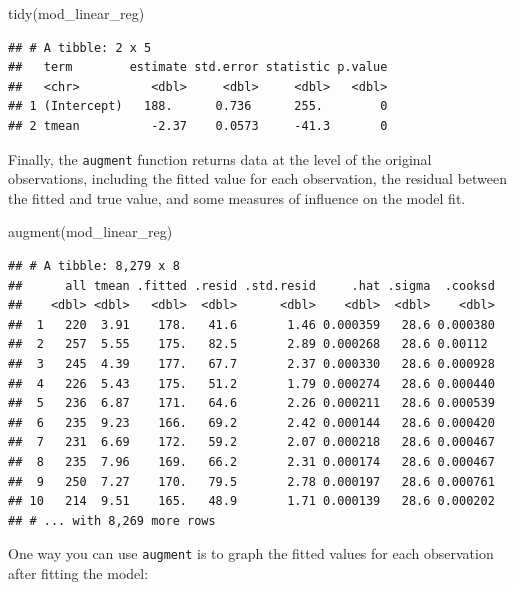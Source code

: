 \documentclass[
]{book}
\newenvironment{Shaded}{\begin{snugshade}}{\end{snugshade}}
\newcommand{\FunctionTok}[1]{\textcolor[rgb]{0.00,0.00,0.00}{#1}}
\newcommand{\NormalTok}[1]{#1}
\begin{document}
\begin{Shaded}
\begin{Highlighting}[]
\FunctionTok{tidy}\NormalTok{(mod\_linear\_reg)}
\end{Highlighting}
\end{Shaded}

\begin{verbatim}
## # A tibble: 2 x 5
##   term        estimate std.error statistic p.value
##   <chr>          <dbl>     <dbl>     <dbl>   <dbl>
## 1 (Intercept)   188.      0.736      255.        0
## 2 tmean          -2.37    0.0573     -41.3       0
\end{verbatim}

Finally, the \texttt{augment} function returns data at the level of the original
observations, including the fitted value for each observation, the residual
between the fitted and true value, and some measures of influence on the model
fit.

\begin{Shaded}
\begin{Highlighting}[]
\FunctionTok{augment}\NormalTok{(mod\_linear\_reg)}
\end{Highlighting}
\end{Shaded}

\begin{verbatim}
## # A tibble: 8,279 x 8
##      all tmean .fitted .resid .std.resid     .hat .sigma  .cooksd
##    <dbl> <dbl>   <dbl>  <dbl>      <dbl>    <dbl>  <dbl>    <dbl>
##  1   220  3.91    178.   41.6       1.46 0.000359   28.6 0.000380
##  2   257  5.55    175.   82.5       2.89 0.000268   28.6 0.00112 
##  3   245  4.39    177.   67.7       2.37 0.000330   28.6 0.000928
##  4   226  5.43    175.   51.2       1.79 0.000274   28.6 0.000440
##  5   236  6.87    171.   64.6       2.26 0.000211   28.6 0.000539
##  6   235  9.23    166.   69.2       2.42 0.000144   28.6 0.000420
##  7   231  6.69    172.   59.2       2.07 0.000218   28.6 0.000467
##  8   235  7.96    169.   66.2       2.31 0.000174   28.6 0.000467
##  9   250  7.27    170.   79.5       2.78 0.000197   28.6 0.000761
## 10   214  9.51    165.   48.9       1.71 0.000139   28.6 0.000202
## # ... with 8,269 more rows
\end{verbatim}

One way you can use \texttt{augment} is to graph the fitted values for each observation
after fitting the model:
\end{document}
